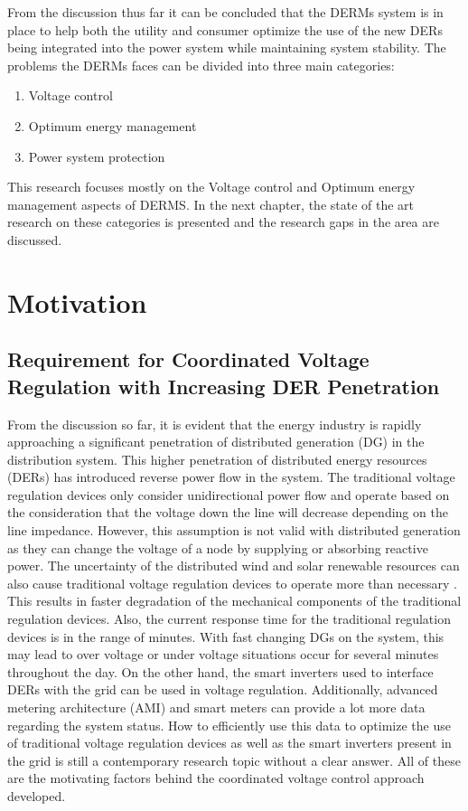 From the discussion thus far it can be concluded that the DERMs system is in place to help both the utility and consumer optimize the use of the new DERs being integrated into the power system while maintaining system stability. The problems the DERMs faces can be divided into three main categories:
\begin{enumerate}
    \item Voltage control
    \item Optimum energy management
    \item Power system protection
\end{enumerate}

This research focuses mostly on the Voltage control and Optimum energy management aspects of DERMS. In the next chapter, the state of the art research on these categories is presented and the research gaps in the area are discussed.

\section{Motivation}
\subsection{Requirement for Coordinated Voltage Regulation with Increasing DER Penetration}
From the discussion so far, it is evident that the energy industry is rapidly approaching a significant penetration of distributed generation (DG) in the distribution system. This higher penetration of distributed energy resources (DERs) has introduced reverse power flow in the system. The traditional voltage regulation devices only consider unidirectional power flow and operate based on the consideration that the voltage down the line will decrease depending on the line impedance. However, this assumption is not valid with distributed generation as they can change the voltage of a node by supplying or absorbing reactive power. The uncertainty of the distributed wind and solar renewable resources can also cause traditional voltage regulation devices to operate more than necessary \cite{int1}. This results in faster degradation of the mechanical components of the traditional regulation devices. Also, the current response time for the traditional regulation devices is in the range of minutes. With fast changing DGs on the system, this may lead to over voltage or under voltage situations occur for several minutes throughout the day. On the other hand, the smart inverters used to interface DERs with the grid can be used in voltage regulation. Additionally, advanced metering architecture (AMI) and smart meters can provide a lot more data regarding the system status. How to efficiently use this data to optimize the use of traditional voltage regulation devices as well as the smart inverters present in the grid is still a contemporary research topic without a clear answer. All of these are the motivating factors behind the coordinated voltage control approach developed.

